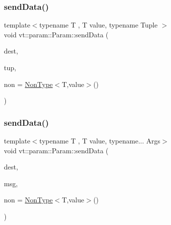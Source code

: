 \subsubsection{\texorpdfstring{send\+Data()}{sendData()}\hspace{0.1cm}{\footnotesize\ttfamily [1/7]}}
{\footnotesize\ttfamily template$<$typename T , T value, typename Tuple $>$ \\
void vt\+::param\+::\+Param\+::send\+Data (\begin{DoxyParamCaption}\item[{\hyperlink{namespacevt_a866da9d0efc19c0a1ce79e9e492f47e2}{Node\+Type} const \&}]{dest,  }\item[{Tuple}]{tup,  }\item[{\hyperlink{structvt_1_1param_1_1_non_type}{Non\+Type}$<$ T, value $>$ \+\_\+\+\_\+attribute\+\_\+\+\_\+((unused))}]{non = {\ttfamily \hyperlink{structvt_1_1param_1_1_non_type}{Non\+Type}$<$T,value$>$()} }\end{DoxyParamCaption})\hspace{0.3cm}{\ttfamily [inline]}}

\mbox{\label{structvt_1_1param_1_1_param_af0791eb37c18d175bdcce5e2f2384427}} 
\subsubsection{\texorpdfstring{send\+Data()}{sendData()}\hspace{0.1cm}{\footnotesize\ttfamily [2/7]}}
{\footnotesize\ttfamily template$<$typename T , T value, typename... Args$>$ \\
void vt\+::param\+::\+Param\+::send\+Data (\begin{DoxyParamCaption}\item[{\hyperlink{namespacevt_a866da9d0efc19c0a1ce79e9e492f47e2}{Node\+Type} const \&}]{dest,  }\item[{\hyperlink{namespacevt_ab2b3d506ec8e8d1540aede826d84a239}{Msg\+Shared\+Ptr}$<$ \hyperlink{structvt_1_1param_1_1_data_msg}{Data\+Msg}$<$ std\+::tuple$<$ Args... $>$$>$$>$}]{msg,  }\item[{\hyperlink{structvt_1_1param_1_1_non_type}{Non\+Type}$<$ T, value $>$ \+\_\+\+\_\+attribute\+\_\+\+\_\+((unused))}]{non = {\ttfamily \hyperlink{structvt_1_1param_1_1_non_type}{Non\+Type}$<$T,value$>$()} }\end{DoxyParamCaption})\hspace{0.3cm}{\ttfamily [inline]}}

